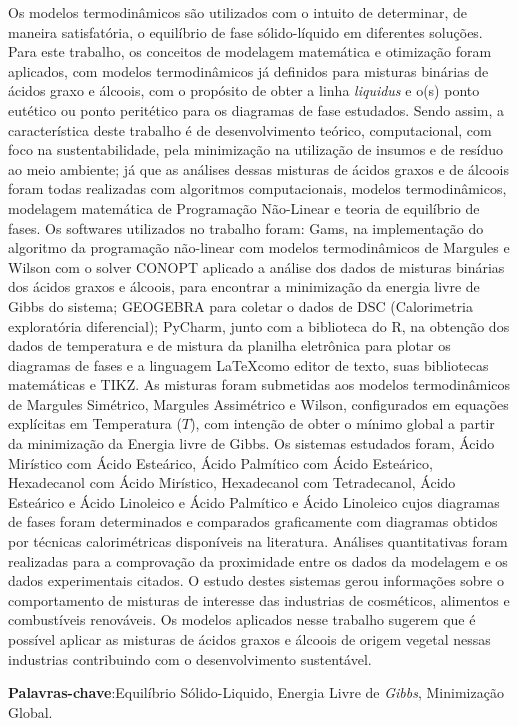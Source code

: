 
\begin{resumo}[RESUMO]
\begin{SingleSpacing}


Os modelos termodinâmicos são utilizados com o intuito de determinar, de maneira satisfatória, o equilíbrio de fase sólido-líquido em diferentes soluções. Para este trabalho, os conceitos de modelagem matemática e otimização foram aplicados, com modelos termodinâmicos já definidos para misturas binárias de ácidos graxo e álcoois, com o propósito de obter a linha \textit{liquidus} e o(s) ponto eutético ou ponto peritético para os diagramas de fase estudados. Sendo assim, a característica deste trabalho é de desenvolvimento teórico, computacional, com foco na sustentabilidade, pela minimização na utilização de insumos e de resíduo ao meio ambiente; já que as análises dessas misturas de ácidos graxos e de álcoois foram todas realizadas com algoritmos computacionais, modelos termodinâmicos, modelagem matemática de Programação Não-Linear e teoria de equilíbrio de fases. Os softwares utilizados no trabalho foram: Gams, na implementação do algoritmo da programação não-linear com modelos termodinâmicos de Margules e Wilson com o solver CONOPT aplicado a análise dos dados de misturas binárias dos ácidos graxos e álcoois, para encontrar a minimização da energia livre de Gibbs do sistema; GEOGEBRA para coletar o dados de DSC (Calorimetria exploratória diferencial); PyCharm, junto com a biblioteca do R, na obtenção dos dados de temperatura e de mistura da planilha eletrônica para plotar os diagramas de fases e a linguagem \LaTeX como editor de texto, suas bibliotecas matemáticas e TIKZ. As misturas foram submetidas aos modelos termodinâmicos de Margules Simétrico, Margules Assimétrico e Wilson, configurados em equações explícitas em Temperatura ($T$), com intenção de obter o mínimo global a partir da minimização da Energia livre de Gibbs. Os sistemas estudados foram, Ácido Mirístico com Ácido Esteárico, Ácido Palmítico com Ácido Esteárico, Hexadecanol com Ácido Mirístico, Hexadecanol com Tetradecanol, Ácido Esteárico e Ácido Linoleico e Ácido Palmítico e Ácido Linoleico cujos diagramas de fases foram determinados e comparados graficamente com diagramas obtidos por técnicas calorimétricas disponíveis na literatura. Análises  quantitativas foram realizadas para a comprovação da proximidade entre os dados da modelagem e os dados experimentais citados. O estudo destes sistemas gerou informações sobre o comportamento de misturas de interesse das industrias de cosméticos, alimentos e combustíveis renováveis. Os modelos aplicados nesse trabalho sugerem que é possível aplicar as misturas de ácidos graxos e álcoois de origem vegetal nessas industrias contribuindo com o desenvolvimento sustentável. 

\vspace{1cm}

\textbf{Palavras-chave}:Equilíbrio Sólido-Liquido, Energia Livre de \textit{Gibbs}, Minimização Global.

\end{SingleSpacing}
\end{resumo}


